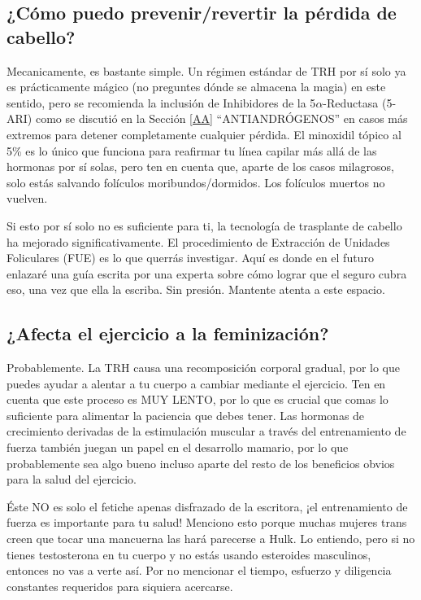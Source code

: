 \documentclass{article}
\begin{document}
\subsection{¿Cómo puedo prevenir/revertir la pérdida de cabello?}\label{11-14}

Mecanicamente, es bastante simple. Un régimen estándar de TRH por sí solo ya es prácticamente mágico (no preguntes dónde se almacena la magia) en este sentido, pero se recomienda la inclusión de Inhibidores de la 5$\alpha$-Reductasa (5-ARI) como se discutió en la Sección \ref{AA} “ANTIANDRÓGENOS” en casos más extremos para detener completamente cualquier pérdida. El minoxidil tópico al 5\% es lo único que funciona para reafirmar tu línea capilar más allá de las hormonas por sí solas, pero ten en cuenta que, aparte de los casos milagrosos, solo estás salvando folículos moribundos/dormidos. Los folículos muertos no vuelven.

Si esto por sí solo no es suficiente para ti, la tecnología de trasplante de cabello ha mejorado significativamente. El procedimiento de Extracción de Unidades Foliculares (FUE) es lo que querrás investigar. Aquí es donde en el futuro enlazaré una guía escrita por una experta sobre cómo lograr que el seguro cubra eso, una vez que ella la escriba. Sin presión. Mantente atenta a este espacio.

\subsection{¿Afecta el ejercicio a la feminización?}

Probablemente. La TRH causa una recomposición corporal gradual, por lo que puedes ayudar a alentar a tu cuerpo a cambiar mediante el ejercicio. Ten en cuenta que este proceso es MUY LENTO, por lo que es crucial que comas lo suficiente para alimentar la paciencia que debes tener. Las hormonas de crecimiento derivadas de la estimulación muscular a través del entrenamiento de fuerza también juegan un papel en el desarrollo mamario, por lo que probablemente sea algo bueno incluso aparte del resto de los beneficios obvios para la salud del ejercicio.

Éste NO es solo el fetiche apenas disfrazado de la escritora, ¡el entrenamiento de fuerza es importante para tu salud! Menciono esto porque muchas mujeres trans creen que tocar una mancuerna las hará parecerse a Hulk. Lo entiendo, pero si no tienes testosterona en tu cuerpo y no estás usando esteroides masculinos, entonces no vas a verte así. Por no mencionar el tiempo, esfuerzo y diligencia constantes requeridos para siquiera acercarse.
\end{document}
